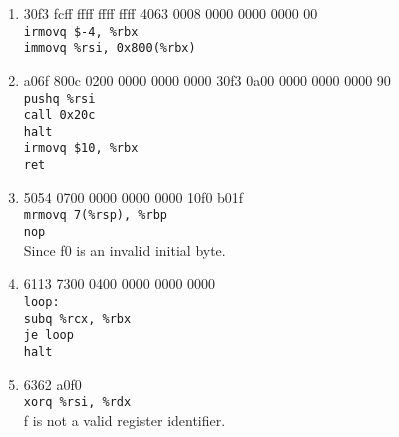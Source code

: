 \documentclass{article}
\begin{document}
\begin{enumerate}[label=\textbf{\Alph*.}]
	\item 30f3 fcff ffff ffff ffff 4063 0008 0000 0000 0000 00 \\
	\texttt{irmovq \$-4, \%rbx} \\
	\texttt{immovq \%rsi, 0x800(\%rbx)}
	\item a06f 800c 0200 0000 0000 0000 30f3 0a00 0000 0000 0000 90 \\
	\texttt{pushq \%rsi} \\
	\texttt{call 0x20c} \\
	\texttt{halt} \\
	\texttt{irmovq \$10, \%rbx} \\
	\texttt{ret}
	\item 5054 0700 0000 0000 0000 10f0 b01f \\
	\texttt{mrmovq 7(\%rsp), \%rbp} \\
	\texttt{nop} \\
	Since f0 is an invalid initial byte.
	\item 6113 7300 0400 0000 0000 0000 \\
	\texttt{loop:} \\
	\hspace*{5mm} \texttt{subq \%rcx, \%rbx} \\
	\hspace*{5mm} \texttt{je loop} \\
	\hspace*{5mm} \texttt{halt}
	\item 6362 a0f0 \\
	\texttt{xorq \%rsi, \%rdx} \\
	f is not a valid register identifier.
\end{enumerate}
\end{document}
